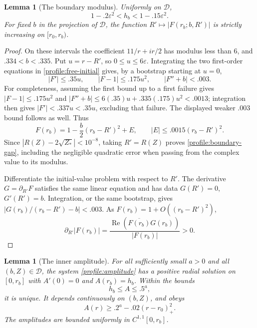 \documentclass[11pt]{article}
\numberwithin{equation}{section}
\newtheorem{lemma}[theorem]{Lemma}
\theoremstyle{definition}
\theoremstyle{remark}
\begin{document}
\begin{lemma}[The boundary modulus]\label{profile:boundary-modulus}
Uniformly on $\mathcal D$,
\begin{equation}\label{profile:boundary-gap}
 1-.2\varepsilon^2<h_b<1-.15\varepsilon^2.
\end{equation}
For fixed $b$ in the projection of $\mathcal D$, the function
$R'\mapsto|F(r_b;b,R')|$ is strictly increasing on $[r_0,r_b)$.
\end{lemma}

\begin{proof}
On these intervals the coefficient $11/r+ir/2$ has modulus less than
$6$, and $.334<b<.335$.  Put $u=r-R'$, so $0\le u\le6\varepsilon$.
Integrating the two first-order equations in \eqref{profile:free-initial}
gives, by a bootstrap starting at $u=0$,
\[
 |F'|\le .35u,\qquad |F-1|\le .175u^2,
       \qquad |F''+b|<.003.
\]
For completeness, assuming the first bound up to a first failure gives
$|F-1|\le.175u^2$ and
$|F''+b|\le6(.35)u+.335(.175)u^2<.0013$; integration then gives
$|F'|<.337u<.35u$, excluding that failure.  The displayed weaker
$.003$ bound follows as well.  Thus
\[
 F(r_b)=1-\frac b2(r_b-R')^2+E,\qquad
       |E|\le.0015(r_b-R')^2.
\]
Since $|R(Z)-2\sqrt{Z_*}|<10^{-8}$, taking $R'=R(Z)$ proves
\eqref{profile:boundary-gap}, including the negligible quadratic error
when passing from the complex value to its modulus.

Differentiate the initial-value problem with respect to $R'$.  The
derivative $G=\partial_{R'}F$ satisfies the same linear equation and has
data $G(R')=0$, $G'(R')=b$.  Integration, or the same bootstrap, gives
$|G(r_b)/(r_b-R')-b|<.003$.  As $F(r_b)=1+O((r_b-R')^2)$,
\[
 \partial_{R'}|F(r_b)|
   =\frac{\operatorname{Re}(\overline{F(r_b)}G(r_b))}{|F(r_b)|}>0.
\]
\end{proof}

\begin{lemma}[The inner amplitude]\label{profile:inner}
For all sufficiently small $a>0$ and all $(b,Z)\in\mathcal D$, the
system \eqref{profile:amplitude} has a positive radial solution on
$[0,r_b]$ with $A'(0)=0$ and $A(r_b)=h_b$.  Within the bounds
\begin{equation}\label{profile:inner-bounds}
 h_b\le A\le .5^a,
\end{equation}
it is unique.  It depends continuously on $(b,Z)$, and obeys
\begin{equation}\label{profile:bulk-barrier}
 A(r)\ge .2^a-.02(r-r_0)_+^2.
\end{equation}
The amplitudes are bounded uniformly in $C^{1,1}[0,r_b]$.
\end{lemma}
\end{document}
